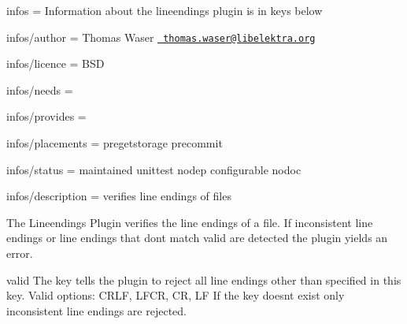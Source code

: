 
\begin{DoxyItemize}
\item infos = Information about the lineendings plugin is in keys below
\item infos/author = Thomas Waser \href{mailto:thomas.waser@libelektra.org}{\texttt{ thomas.\+waser@libelektra.\+org}}
\item infos/licence = B\+SD
\item infos/needs =
\item infos/provides =
\item infos/placements = pregetstorage precommit
\item infos/status = maintained unittest nodep configurable nodoc
\item infos/description = verifies line endings of files
\end{DoxyItemize}

The Lineendings Plugin verifies the line endings of a file. If inconsistent line endings or line endings that don\textquotesingle{}t match {\ttfamily valid} are detected the plugin yields an error.

{\ttfamily valid} The key tells the plugin to reject all line endings other than specified in this key. Valid options\+: C\+R\+LF, L\+F\+CR, CR, LF If the key doesn\textquotesingle{}t exist only inconsistent line endings are rejected. 